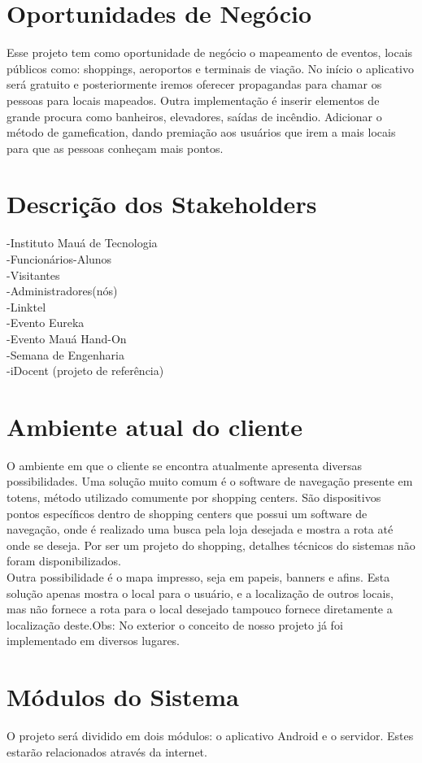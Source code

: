 \documentclass[12pt]{article}
\begin{document}
\section*{Oportunidades de Negócio}
	Esse projeto tem como oportunidade de negócio o mapeamento de eventos, locais públicos como: shoppings, aeroportos e terminais de viação.
	No início o aplicativo será gratuito e posteriormente iremos oferecer propagandas para chamar os pessoas para locais mapeados. Outra implementação é inserir elementos de grande procura como banheiros, elevadores, saídas de incêndio. Adicionar o método de gamefication, dando premiação aos usuários que irem a mais locais para que as pessoas conheçam mais pontos.
\section*{Descrição dos Stakeholders}
-Instituto Mauá de Tecnologia\\-Funcionários-Alunos\\-Visitantes\\-Administradores(nós)\\-Linktel\\-Evento Eureka\\
-Evento Mauá Hand-On\\-Semana de Engenharia\\-iDocent (projeto de referência)

\section*{Ambiente atual do cliente} 
O ambiente em que o cliente se encontra atualmente apresenta diversas possibilidades. Uma solução muito comum é o software de navegação presente em totens, método utilizado comumente por shopping centers. São dispositivos pontos específicos dentro de shopping centers que possui um software de navegação, onde é realizado uma busca pela loja desejada e mostra a rota até onde se deseja. Por ser um projeto do shopping, detalhes técnicos do sistemas não foram disponibilizados.\\
Outra possibilidade é o mapa impresso, seja em papeis, banners e afins. Esta solução apenas mostra o local para o usuário, e a localização de outros locais, mas não fornece a rota para o local desejado tampouco fornece diretamente a localização deste.Obs: No exterior o conceito de nosso projeto já foi implementado em diversos lugares.
\section*{Módulos do Sistema}
O projeto será dividido em dois módulos: o aplicativo Android e o servidor. Estes estarão relacionados através da internet.
\end{document}
